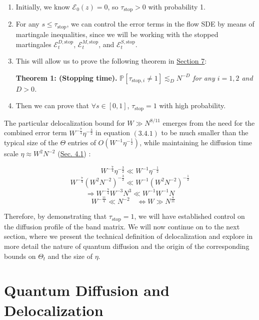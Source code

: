 \documentclass[11pt]{article}
\newenvironment{boxtheorem}[1]
  {\begin{mdframed}\noindent\textbf{#1}\itshape\space}
  {\end{mdframed}}
\newcommand{\E}{\mathcal{E}}
\newcommand{\sto}{\text{stop}}
\begin{document}
\begin{enumerate}

\item Initially, we know $\E_0(z) = 0$, so $\tau_{\text{stop}} > 0$ with probability 1.


\item For any $s \leq \tau_{\text{stop}}$, we can control the error terms in the flow SDE by means of martingale inequalities, since we will be working with the stopped martingales $\E_t^{D, \sto}$, $\E_t^{M, \sto}$, and $\E_t^{S, \sto}$. 


\item This will allow us to prove the following theorem in \hyperref[proof-stop]{Section 7}:

\begin{boxtheorem}{Theorem 1: (Stopping time).} $\mathbb{P}[\tau_{\text{stop}, i} \neq  1] \lesssim_D N^{-D}$ for any $i=1, 2$ and $D > 0$.
\end{boxtheorem}

\item Then we can prove that $\forall s \in [0,1]$, $\tau_\sto =1$ with high probability. 

\end{enumerate}

\noindent The particular delocalization bound for $W \gg N^{8/11}$ emerges from the need for the combined error term $W^{-\frac{7}{4}}\eta^{-\frac{3}{2}}$ in equation $(3.4.1)$ to be much smaller than the typical size of the $\Theta$ entries of $O( W^{-1}\eta^{-\frac{1}{2}})$, while maintaining he diffusion time scale $\eta \approx W^2N^{-2}$ (\hyperref[diffusion]{Sec. 4.1}) :
	
$$W^{-\frac{7}{4}}\eta^{-\frac{3}{2}} \ll W^{-1}\eta^{-\frac{1}{2}}$$
$$W^{-\frac{7}{4}}(W^2N^{-2})^{-\frac{3}{2}} \ll W^{-1}(W^2N^{-2})^{-\frac{1}{2}}$$
$$\Rightarrow W^{-\frac{7}{4}}W^{-3}N^3 \ll W^{-1}W^{-1}N$$
$$\quad W^{-\frac{11}{4}} \ll N^{-2}\quad\Leftrightarrow W \gg N^{\frac{8}{11}}$$

\noindent Therefore, by demonstrating that $\tau_{\sto}=1$, we will have established control on the diffusion profile of the band matrix. We will now continue on to the next section, where we present the technical definition of delocalization and explore in more detail the nature of quantum diffusion and the origin of the corresponding bounds on $\Theta_t$ and the size of $\eta$. 


\newpage
\section{Quantum Diffusion and Delocalization}
\label{sec:deloc}
\end{document}
